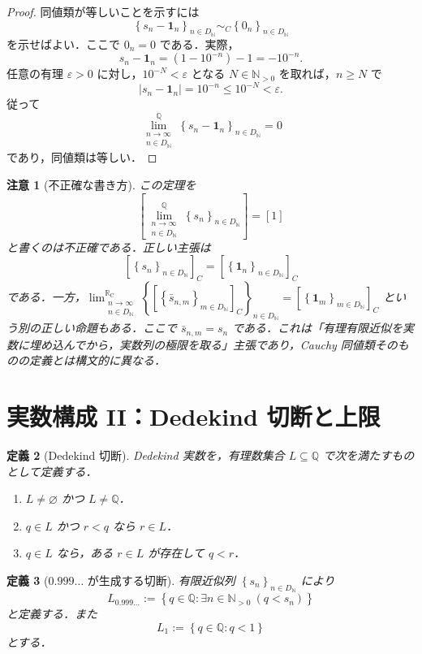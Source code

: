 \documentclass[a4paper,11pt]{ltjsarticle}
\theoremstyle{jpdef}
\newtheorem{definition}{定義}[section]
\newtheorem{warning}[definition]{注意}
\theoremstyle{jpthm}
\newcommand{\N}{\mathbb{N}}
\newcommand{\Q}{\mathbb{Q}}
\newcommand{\Ns}{\N_{>0}}
\newcommand{\DN}{D_{\N}}
\newcommand{\set}[1]{\left\{#1\right\}}
\newcommand{\abs}[1]{\left\lvert#1\right\rvert}
\newcommand{\seq}[2]{\left\{#1\right\}_{#2}}
\newcommand{\RealC}{\mathbb{R}_{\mathrm C}}
\newcommand{\eps}{\varepsilon}
\begin{document}
\begin{proof}
同値類が等しいことを示すには
\[
  \seq{s_n-\mathbf1_n}{n\in\DN}\sim_C\seq{0_n}{n\in\DN}
\]
を示せばよい．ここで \(0_n=0\) である．実際，
\[
  s_n-\mathbf1_n=(1-10^{-n})-1=-10^{-n}.
\]
任意の有理 \(\eps>0\) に対し，\(10^{-N}<\eps\) となる \(N\in\Ns\) を取れば，\(n\ge N\) で
\[
  \abs{s_n-\mathbf1_n}=10^{-n}\le10^{-N}<\eps.
\]
従って
\[
  \lim_{\substack{n\to\infty\\ n\in\DN}}^{\Q}\seq{s_n-\mathbf1_n}{n\in\DN}=0
\]
であり，同値類は等しい．
\end{proof}

\begin{warning}[不正確な書き方]
この定理を
\[
  [\lim_{\substack{n\to\infty\\ n\in\DN}}^{\Q}\seq{s_n}{n\in\DN}]=[1]
\]
と書くのは不正確である．正しい主張は
\[
  [\seq{s_n}{n\in\DN}]_C=[\seq{\mathbf1_n}{n\in\DN}]_C
\]
である．一方，\(\lim_{\substack{n\to\infty\\ n\in\DN}}^{\RealC}\seq{[\seq{\bar s_{n,m}}{m\in\DN}]_C}{n\in\DN}= [\seq{\mathbf1_m}{m\in\DN}]_C\) という別の正しい命題もある．ここで \(\bar s_{n,m}=s_n\) である．これは「有理有限近似を実数に埋め込んでから，実数列の極限を取る」主張であり，Cauchy 同値類そのものの定義とは構文的に異なる．
\end{warning}

\section{実数構成 II：Dedekind 切断と上限}

\begin{definition}[Dedekind 切断]
Dedekind 実数を，有理数集合 \(L\subseteq\Q\) で次を満たすものとして定義する．
\begin{enumerate}
\item \(L\ne\varnothing\) かつ \(L\ne\Q\)．
\item \(q\in L\) かつ \(r<q\) なら \(r\in L\)．
\item \(q\in L\) なら，ある \(r\in L\) が存在して \(q<r\)．
\end{enumerate}
\end{definition}

\begin{definition}[\(0.999\ldots\) が生成する切断]
有限近似列 \(\seq{s_n}{n\in\DN}\) により
\[
  L_{0.999\ldots}:=
  \set{q\in\Q:\exists n\in\Ns\ (q<s_n)}
\]
と定義する．また
\[
  L_1:=\set{q\in\Q:q<1}
\]
とする．
\end{definition}
\end{document}
